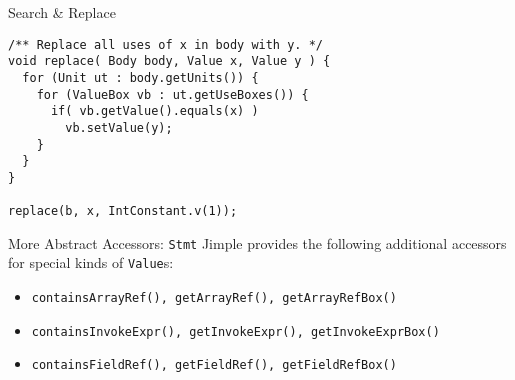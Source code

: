 

\begin{slide}{Search \& Replace}
{\small
\begin{verbatim}
/** Replace all uses of x in body with y. */
void replace( Body body, Value x, Value y ) {
  for (Unit ut : body.getUnits()) {
    for (ValueBox vb : ut.getUseBoxes()) {
      if( vb.getValue().equals(x) ) 
        vb.setValue(y);
    }
  }
}

replace(b, x, IntConstant.v(1));
\end{verbatim}
}
\end{slide}

\begin{slide}{More Abstract Accessors: {\tt Stmt}}
Jimple provides the following additional accessors for special kinds of {\tt Value}s:

\begin{itemize}
\item {\tt containsArrayRef(),
 getArrayRef(),~getArrayRefBox()}
\item {\tt containsInvokeExpr(), getInvokeExpr(),~getInvokeExprBox()}
\item {\tt containsFieldRef(), getFieldRef(),~getFieldRefBox()}
\end{itemize}

\end{slide}
